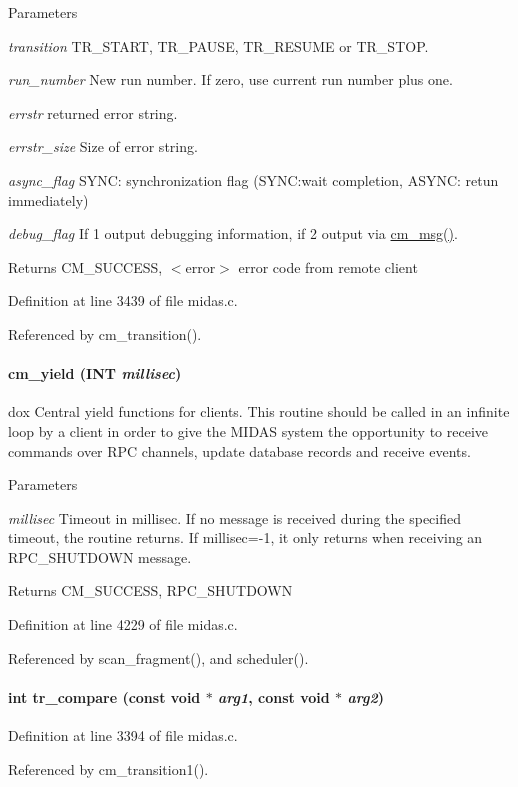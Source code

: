 \begin{DoxyParams}{Parameters}
\item[{\em transition}]TR\_\-START, TR\_\-PAUSE, TR\_\-RESUME or TR\_\-STOP. \item[{\em run\_\-number}]New run number. If zero, use current run number plus one. \item[{\em errstr}]returned error string. \item[{\em errstr\_\-size}]Size of error string. \item[{\em async\_\-flag}]SYNC: synchronization flag (SYNC:wait completion, ASYNC: retun immediately) \item[{\em debug\_\-flag}]If 1 output debugging information, if 2 output via \hyperlink{group__msgfunctionc_gaac032ca2438c47466bfc9722de6746ea}{cm\_\-msg()}. \end{DoxyParams}
\begin{DoxyReturn}{Returns}
CM\_\-SUCCESS, $<$error$>$ error code from remote client 
\end{DoxyReturn}


Definition at line 3439 of file midas.c.

Referenced by cm\_\-transition().
\paragraph[{cm\_\-yield}]{ cm\_\-yield ({\bf INT} {\em millisec})}\hfill\label{group__cmfunctionc_ga115565c5a1d9591fcabf844c1dd624f8}
dox Central yield functions for clients. This routine should be called in an infinite loop by a client in order to give the MIDAS system the opportunity to receive commands over RPC channels, update database records and receive events. 
\begin{DoxyParams}{Parameters}
\item[{\em millisec}]Timeout in millisec. If no message is received during the specified timeout, the routine returns. If millisec=-\/1, it only returns when receiving an RPC\_\-SHUTDOWN message. \end{DoxyParams}
\begin{DoxyReturn}{Returns}
CM\_\-SUCCESS, RPC\_\-SHUTDOWN 
\end{DoxyReturn}


Definition at line 4229 of file midas.c.

Referenced by scan\_\-fragment(), and scheduler().
\paragraph[{tr\_\-compare}]{\setlength{\rightskip}{0pt plus 5cm}int tr\_\-compare (const void $\ast$ {\em arg1}, \/  const void $\ast$ {\em arg2})}\hfill\label{group__cmfunctionc_ga0a3c6097ceeaa7dcbe2bb3ea6a768e70}


Definition at line 3394 of file midas.c.

Referenced by cm\_\-transition1().
